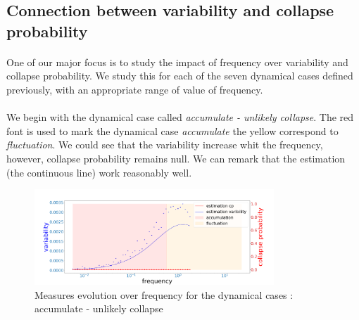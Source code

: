 \documentclass{article}
\begin{document}





\newpage
\subsection{Connection between variability and collapse probability}

\label{impact_freq}

\paragraph{}
One of our major focus is to study the impact of frequency over variability and collapse probability. We study this for each of the seven dynamical cases defined previously, with an appropriate range of value of frequency.

\paragraph{}
We begin with the dynamical case called \textit{accumulate - unlikely collapse}. The red font is used to mark the dynamical case \textit{accumulate} the yellow correspond to \textit{fluctuation}. We could see that the variability increase whit the frequency, however, collapse probability remains null. We can remark that the estimation (the continuous line) work reasonably well. 


\begin{figure}[h!]
\begin{center}
\includegraphics[width=9cm]{results/measures_acc_unlikely.png}
\end{center}
\caption{\label{fig:temp}Measures evolution over frequency for the dynamical cases : accumulate - unlikely collapse}
\end{figure}
\end{document}
